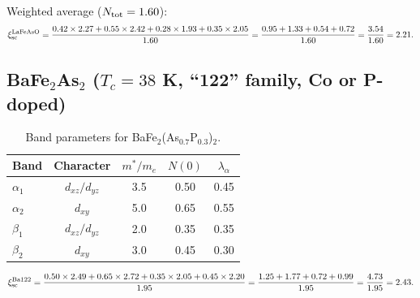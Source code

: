 \documentclass[11pt]{article}
\begin{document}
Weighted average ($N_{\rm tot} = 1.60$):
\begin{equation}
\xi_{\rm sc}^{\rm LaFeAsO} = \frac{0.42\times 2.27 + 0.55\times 2.42 + 0.28\times 1.93 + 0.35\times 2.05}{1.60} = \frac{0.95 + 1.33 + 0.54 + 0.72}{1.60} = \frac{3.54}{1.60} = 2.21.
\end{equation}

\subsection{BaFe$_2$As$_2$ ($T_c = 38$ K, ``122'' family, Co or P-doped)}

\begin{table}[h]
\centering
\caption{Band parameters for BaFe$_2$(As$_{0.7}$P$_{0.3}$)$_2$.}
\begin{tabular}{lcccc}
\toprule
Band & Character & $m^*/m_e$ & $N(0)$ & $\lambda_\alpha$ \\
\midrule
$\alpha_1$ & $d_{xz}/d_{yz}$ & 3.5 & 0.50 & 0.45 \\
$\alpha_2$ & $d_{xy}$ & 5.0 & 0.65 & 0.55 \\
$\beta_1$ & $d_{xz}/d_{yz}$ & 2.0 & 0.35 & 0.35 \\
$\beta_2$ & $d_{xy}$ & 3.0 & 0.45 & 0.30 \\
\bottomrule
\end{tabular}
\end{table}

\begin{equation}
\xi_{\rm sc}^{\rm Ba122} = \frac{0.50\times 2.49 + 0.65\times 2.72 + 0.35\times 2.05 + 0.45\times 2.20}{1.95} = \frac{1.25 + 1.77 + 0.72 + 0.99}{1.95} = \frac{4.73}{1.95} = 2.43.
\end{equation}
\end{document}
